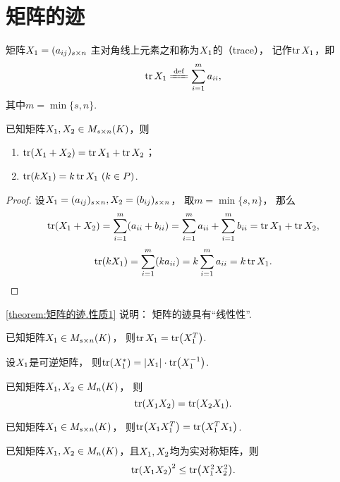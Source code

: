 \section{矩阵的迹}
\begin{definition}
矩阵\(X_1=(a_{ij})_{s \times n}\)
主对角线上元素之和称为\(X_1\)的（trace），
记作\(\tr X_1\)，即\[
	\tr\A \defeq \sum_{i=1}^m a_{ii},
\]
其中\(m = \min\{s,n\}\).
\end{definition}

\begin{property}\label{theorem:矩阵的迹.性质1}
已知矩阵\(X_1,X_2 \in M_{s \times n}(K)\)，则
\begin{enumerate}
	\item \(\tr(X_1+X_2) = \tr X_1 + \tr X_2\)；
	\item \(\tr(k X_1) = k \tr X_1\ (k \in P)\).
\end{enumerate}
\begin{proof}
设\(X_1=(a_{ij})_{s \times n},
X_2=(b_{ij})_{s \times n}\)，
取\(m = \min\{s,n\}\)，
那么\[
	\tr(X_1+X_2) = \sum_{i=1}^m (a_{ii}+b_{ii})
	= \sum_{i=1}^m a_{ii}
	+ \sum_{i=1}^m b_{ii}
	= \tr X_1 + \tr X_2,
\]\[
	\tr(k X_1) = \sum_{i=1}^m (k a_{ii})
	= k \sum_{i=1}^m a_{ii}
	= k \tr X_1.
\]
\end{proof}
\end{property}
\cref{theorem:矩阵的迹.性质1} 说明：
矩阵的迹具有“线性性”.

\begin{property}\label{theorem:矩阵的迹.性质2}
已知矩阵\(X_1 \in M_{s \times n}(K)\)，
则\(\tr X_1 = \tr(X_1^T)\).
\end{property}

\begin{property}
设\(X_1\)是可逆矩阵，
则\(\tr(X_1^*) = \abs{X_1} \cdot \tr(X_1^{-1})\).
\end{property}

\begin{property}\label{theorem:矩阵的迹.矩阵乘积交换次序不变迹}
已知矩阵\(X_1,X_2 \in M_n(K)\)，
则\[
	\tr(X_1X_2) = \tr(X_2X_1).
\]
\end{property}

\begin{property}
已知矩阵\(X_1 \in M_{s \times n}(K)\)，
则\(\tr(X_1X_1^T) = \tr(X_1^TX_1)\).
\end{property}

\begin{property}
已知矩阵\(X_1,X_2 \in M_n(K)\)，且\(X_1,X_2\)均为实对称矩阵，则\[
	\tr(X_1X_2)^2 \leq \tr(X_1^2X_2^2).
\]
\end{property}
